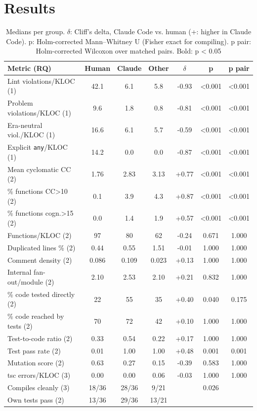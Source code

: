 \documentclass[10pt,conference]{IEEEtran}
\begin{document}
\section{Results}
\begin{table}[t]
\caption{Medians per group. $\delta$: Cliff's delta, Claude Code vs. human (+: higher in Claude Code). p: Holm-corrected Mann--Whitney U (Fisher exact for compiling). p pair: Holm-corrected Wilcoxon over matched pairs. Bold: p \textless{} 0.05}
\label{tab:results}
\centering
\scriptsize
\setlength{\tabcolsep}{2.5pt}
\begin{tabular}{lcccccc}
\toprule
Metric (RQ) & Human & Claude & Other & $\delta$ & p & p pair \\
\midrule
Lint violations/KLOC (1) & 42.1 & 6.1 & 5.8 & -0.93 & \textless{}0.001 & \textless{}0.001 \\
Problem violations/KLOC (1) & 9.6 & 1.8 & 0.8 & -0.81 & \textless{}0.001 & \textless{}0.001 \\
Era-neutral viol./KLOC (1) & 16.6 & 6.1 & 5.7 & -0.59 & \textless{}0.001 & \textless{}0.001 \\
Explicit \texttt{any}/KLOC (1) & 14.2 & 0.0 & 0.0 & -0.87 & \textless{}0.001 & \textless{}0.001 \\
Mean cyclomatic CC (2) & 1.76 & 2.83 & 3.13 & +0.77 & \textless{}0.001 & \textless{}0.001 \\
\% functions CC\textgreater{}10 (2) & 0.1 & 3.9 & 4.3 & +0.87 & \textless{}0.001 & \textless{}0.001 \\
\% functions cogn.\textgreater{}15 (2) & 0.0 & 1.4 & 1.9 & +0.57 & \textless{}0.001 & \textless{}0.001 \\
Functions/KLOC (2) & 97 & 80 & 62 & -0.24 & 0.671 & 1.000 \\
Duplicated lines \% (2) & 0.44 & 0.55 & 1.51 & -0.01 & 1.000 & 1.000 \\
Comment density (2) & 0.086 & 0.109 & 0.023 & +0.13 & 1.000 & 1.000 \\
Internal fan-out/module (2) & 2.10 & 2.53 & 2.10 & +0.21 & 0.832 & 1.000 \\
\% code tested directly (2) & 22 & 55 & 35 & +0.40 & 0.040 & 0.175 \\
\% code reached by tests (2) & 70 & 72 & 42 & +0.10 & 1.000 & 1.000 \\
Test-to-code ratio (2) & 0.33 & 0.54 & 0.22 & +0.17 & 1.000 & 1.000 \\
Test pass rate (2) & 0.01 & 1.00 & 1.00 & +0.48 & 0.001 & 0.001 \\
Mutation score (2) & 0.63 & 0.27 & 0.15 & -0.39 & 0.583 & 1.000 \\
tsc errors/KLOC (3) & 0.00 & 0.00 & 0.06 & -0.03 & 1.000 & 1.000 \\
Compiles cleanly (3) & 18/36 & 28/36 & 9/21 &  & 0.026 &  \\
Own tests pass (2) & 13/36 & 29/36 & 13/21 &  &  &  \\
\bottomrule
\end{tabular}
\end{table}
\end{document}
